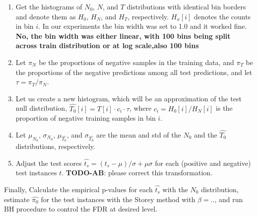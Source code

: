 \documentclass{article}
\newcommand{\todo}[2]{{\color{red} {\bf TODO-#1}: #2}}
\begin{document}
\begin{enumerate}%
	\itemsep-3pt  		
	\item Get the histograms of $N_0$, $N$, and $T$ distributions with identical bin borders and denote them as $H_0$, $H_N$, and $H_T$, respectively. $H_x[i]$ denotes the counts in bin $i$.  In our experiments the bin width was set to 1.0 and it worked fine. \textbf{No, the bin width was either linear, with 100 bins being split across train distribution or at log scale,also 100 bins}
	
	\item Let $\pi_N$ be the proportions of negative samples in the training data, and $\pi_T$ be the proportions of the negative predictions among all test predictions, and let $\tau=\pi_T/\pi_N$. 
	
	\item Let us create a new histogram, which will be an approximation of the test null distribution, $\hat{T_0}[i]=T[i]\cdot c_i\cdot \tau$, where $c_i=H_0[i]/H_N[i]$ is the proportion of negative training samples in bin $i$.
	
	\item Let $\mu_{N_0}$, $\sigma_{N_0}$, $\mu_{\hat{T_0}}$, and $\sigma_{\hat{T_0}}$ are the mean and std of the $N_0$ and the $\hat{T_0}$ distributions, respectively. 
	
	\item Adjust the test scores $\hat{t_s} = (t_s-\mu)/\sigma + \mu \sigma$ for each (positive and negative) test instances $t$. \todo{AB}{please correct this transformation}.
\end{enumerate}


	Finally, Calculate the empirical p-values for each $\hat{t_s}$ with the $N_0$ distribution, estimate  $\hat{\pi_0}$ for the test instances with the Storey method with $\beta= ..$, and run BH procedure to control the FDR at desired level.
	
	
	
%	
%	
	
\end{document}
